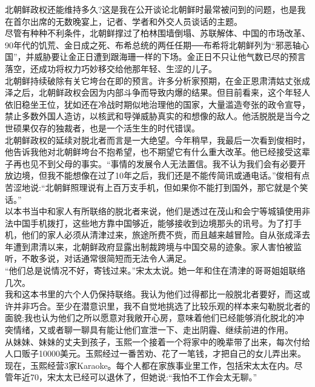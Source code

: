 北朝鲜政权还能维持多久?这是我在公开谈论北朝鲜时最常被问到的问题，也是我在首尔出席的无数晚宴上，记者、学者和外交人员谈话的主题。\\

尽管有种种不利条件，北朝鲜撑过了柏林围墙倒塌、苏联解体、中国的市场改革、90年代的饥荒、金日成之死、布希总统的两任任期──布希将北朝鲜列为“邪恶轴心国”，并威胁要让金正日遭到跟海珊一样的下场。金正日不只让他气数已尽的预言落空，还成功将权力巧妙移交给他那年轻、生涩的儿子。\\

北朝鲜持续破除有关它垮台在即的预言。许多分析家预期，在金正恩肃清姑丈张成泽之后，北朝鲜政权会因为内部斗争而导致内爆的结果。但目前看来，这个年轻人依旧稳坐王位，犹如还在冷战时期似地治理他的国家，大量滥造夸张的政令宣导，禁止多数外国人造访，以核武和导弹威胁真实的和想像的敌人。他活脱脱是当今之世硕果仅存的独裁者，也是一个活生生的时代错误。\\

北朝鲜政权的延续对脱北者而言是一大绝望。今年稍早，我最后一次看到俊相时，他告诉我他对北朝鲜垮台不抱希望，也不期望它有什么重大改革。他已经接受这辈子再也见不到父母的事实。“事情的发展令人无法置信。我不认为我们会有必要开放边境，但我不能想像在过了10年之后，我们还是不能传简讯或通电话。”俊相有点苦涩地说:“北朝鲜照理说有上百万支手机，但如果你不能打到国外，那它就是个笑话。”\\

以本书当中和家人有所联络的脱北者来说，他们是透过在茂山和会宁等城镇使用非法中国手机拨打，这些地方靠中国够近，能够接收到边境那头的讯号。为了打手机，他们的家人必须从清津过来，旅途所费不赀，而且越来越冒险。自从张成泽去年遭到肃清以来，北朝鲜政府显露出制裁跨境与中国交易的迹象。家人害怕被监听，不敢多说，对话通常很简短而无法令人满足。\\

“他们总是说情况不好，寄钱过来。”宋太太说。她一年和住在清津的哥哥姐姐联络几次。\\

我和这本书里的六个人仍保持联络。我认为他们过得都比一般脱北者要好，而这或许并非巧合。至少在潜意识里，我不自觉地挑选了比较乐观的样本来勾勒脱北者的面貌;我也认为他们之所以愿意对我敞开心房，意味着他们已经能够消化脱北的冲突情绪，又或者聊一聊具有能让他们宣泄一下、走出阴霾、继续前进的作用。\\

从妹妹、妹妹的丈夫到孩子，玉熙一个接着一个将家中的晚辈带了出来，每次付给人口贩子10000美元。玉熙经过一番苦劝、花了一笔钱，才把自己的女儿弄出来。现在，玉熙经营3家Karaoke。每个人都在家族事业里工作，包括宋太太在内。尽管年近70，宋太太已经可以退休了，但她说:“我怕不工作会太无聊。”\\

